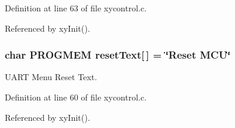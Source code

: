 Definition at line 63 of file xycontrol.\-c.



Referenced by xy\-Init().

\hypertarget{group__xycontrol_ga27915b4caf41f74542980a4ea0f1726a}{
\subsubsection[{reset\-Text}]{\setlength{\rightskip}{0pt plus 5cm}char P\-R\-O\-G\-M\-E\-M reset\-Text\mbox{[}$\,$\mbox{]} = \char`\"{}Reset M\-C\-U\char`\"{}}}\label{group__xycontrol_ga27915b4caf41f74542980a4ea0f1726a}


U\-A\-R\-T Menu Reset Text. 



Definition at line 60 of file xycontrol.\-c.



Referenced by xy\-Init().

